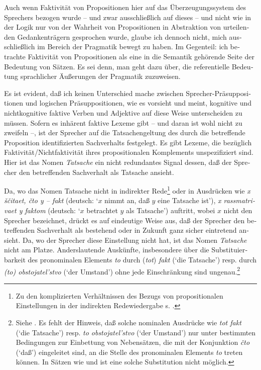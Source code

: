\documentclass[output=paper]{langscibook}
\begin{document}
\begin{otherlanguage}{german}
Auch wenn Faktivität von Propositionen hier auf das Überzeugungssystem des Spre\-chers bezogen wurde -- und zwar ausschließlich auf dieses -- und nicht wie in der Logik nur von der Wahrheit von Propositionen in Abstraktion von urteilenden Gedan\-ken\-trä\-gern gesprochen wurde, glaube ich dennoch nicht, mich aus\-schließ\-lich im Bereich der Pragmatik bewegt zu haben. Im Gegenteil: ich betrachte Faktivität von Propositionen als eine in die Semantik gehörende Seite der Bedeutung von Sätzen. Es sei denn, man geht dazu über, die referentielle Bedeutung sprachlicher Äußerungen der Pragmatik zuzuweisen.

Es ist evident, daß ich keinen Unterschied mache zwischen Sprecher-Prä\-sup\-po\-si\-tio\-nen und logischen Präsuppositionen, wie es \citet{norrick1978factive-adjectives-and-the-theory-of-factivity} vorsieht und meint, kognitive und nichtkognitive faktive Verben und Adjektive auf diese Weise unterscheiden zu müssen. Sofern es inhärent faktive Lexeme gibt -- und daran ist wohl nicht zu zweifeln --, ist der Sprecher auf die Tatsachengeltung des durch die betreffende Proposition identifizierten Sachverhalts festgelegt. Es gibt Le\-xe\-me, die bezüglich Faktivität/Nichtfaktivität ihres propositionalen Komplements unspezifiziert sind. Hier ist das Nomen \textit{Tatsache} ein nicht redundantes Signal dessen, daß der Sprecher den betreffenden Sachverhalt als Tatsache ansieht.

Da, wo das Nomen Tatsache nicht in indirekter Rede\footnote{Zu den komplizierten Verhältnissen des Bezugs von propositionalen Einstellungen in der indirekten Redewiedergabe s. \citet{steube1983indirekte-rede-und-zeitverlauf}.} oder in Ausdrücken wie \textit{x ščitaet, čto y -- fakt} (deutsch: ‘$x$ nimmt an, daß $y$ eine Tatsache ist’), \textit{x rassmatrivaet y faktom} (deutsch: ‘$x$ betrachtet $y$ als Tatsache’) auftritt, wobei $x$ nicht den Sprecher bezeichnet, drückt es auf eindeutige Weise aus, daß der Sprecher den betreffenden Sachverhalt als bestehend oder in Zukunft ganz sicher eintretend ansieht. Da, wo der Sprecher diese Einstellung nicht hat, ist das Nomen \textit{Tatsache} nicht am Platze. Anderslautende Auskünfte, insbesondere über die Substituierbarkeit des pronominalen Elements \textit{to} durch (\textit{tot}) \textit{fakt} (‘die Tatsache’) resp. durch \textit{(to) obstojatel’stvo} (‘der Umstand’) ohne jede Einschränkung sind ungenau.\footnote{Siehe \citet[693]{svedova1970grammatika-sovremennogo-russkogo-literaturnogo-jazyka}. Es fehlt der Hinweis, daß solche nominalen Ausdrücke wie \textit{tot fakt} (‘die Tatsache’) resp. \textit{to obstojatel’stvo} (‘der Umstand’) nur unter bestimmten Bedingungen zur Einbettung von Nebensätzen, die mit der Konjunktion \textit{čto} (‘daß’) eingeleitet sind, an die Stelle des pronominalen Elements \textit{to} treten können. In Sätzen wie  und  ist eine solche Substitution nicht möglich. 

}
\end{otherlanguage}
\end{document}
